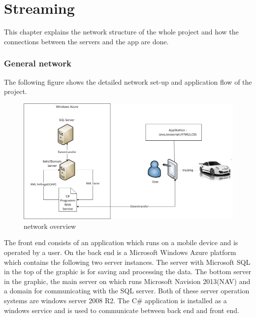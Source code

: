 \chapter{Streaming} \label{chapter:Streaming}
This chapter explains the network structure of the whole project and how the connections between the servers and the app are done.
\subsection{General network}
The following figure shows the detailed network set-up and application flow of the project.
\begin{figure}[htbp]
\centering
\includegraphics[width=\textwidth,height=\textheight,keepaspectratio]
{graphics/networkoverview.png}
\caption{network overview}
\end{figure}

The front end consists of an application which runs on a mobile device and is operated by a user. On the back end is a Microsoft Windows Azure platform which contains the following two server instances. The server with Microsoft SQL in the top of the graphic is for saving and processing the data. The bottom server in the graphic, the main server on which runs Microsoft Navision 2013(NAV) and a domain for communicating with the SQL server. Both of these server operation systems are windows server 2008 R2. The C\# application is installed as a windows service and is used to communicate between back end and front end.

